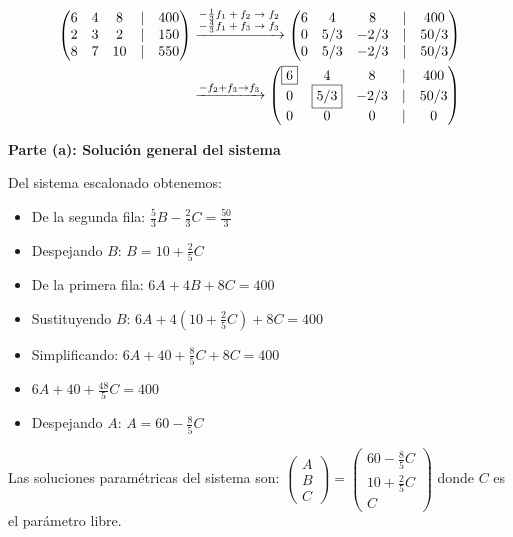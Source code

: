 \begin{prob}
\begin{myproof}
\begin{align*}
\begin{pmatrix}
6&4&8&|&400\\
2&3&2&|&150\\
8&7&10&|&550
\end{pmatrix}&\xrightarrow{\begin{scriptsize}
\begin{matrix}
-\frac{1}{3} f_1+f_2 \rightarrow f_2\\ -\frac{4}{3} f_1+f_3 \rightarrow f_3
\end{matrix}\end{scriptsize}}\begin{pmatrix}
6 & 4 & 8 & |& 400 \\
0 & 5/3 & -2/3 & |&50/3 \\
0 & 5/3 & -2/3 &|& 50/3
\end{pmatrix} \\& \xrightarrow{-f_2+f_3 \rightarrow f_3}\begin{pmatrix}
\boxed{6} & 4 & 8 & |& 400 \\
0 & \boxed{5/3} & -2/3 & |&50/3 \\
0 & 0 & 0 &|& 0
\end{pmatrix}
\end{align*}

\textbf{Parte (a): Solución general del sistema}

Del sistema escalonado obtenemos:
\begin{itemize}
\item De la segunda fila: $\frac{5}{3}B - \frac{2}{3}C = \frac{50}{3}$
\item  Despejando $B$: $B = 10 + \frac{2}{5}C$
\item De la primera fila: $6A + 4B + 8C = 400$
\item Sustituyendo $B$: $6A + 4(10 + \frac{2}{5}C) + 8C = 400$
\item Simplificando: $6A + 40 + \frac{8}{5}C + 8C = 400$
\item $6A + 40 + \frac{48}{5}C = 400$
\item Despejando $A$: $A = 60 - \frac{8}{5}C$
\end{itemize}


Las soluciones paramétricas del sistema son: $\begin{pmatrix} A \\ B \\ C \end{pmatrix} = \begin{pmatrix} 60-\frac{8}{5}C\\ 10+\frac{2}{5}C\\C \end{pmatrix}$ donde $C$ es el parámetro libre.


\end{myproof}
\end{prob}
